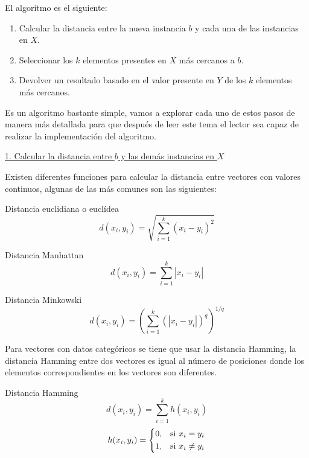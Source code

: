 \documentclass[11pt,fleqn]{book} %
\begin{document}
El algoritmo es el siguiente:
\begin{enumerate}
\item Calcular la distancia entre la nueva instancia $b$ y cada una de las instancias en $X$.
\item Seleccionar los $k$ elementos presentes en $X$ más cercanos a $b$.
\item Devolver un resultado basado en el valor presente en $Y$ de los $k$ elementos más cercanos.
\end{enumerate}

Es un algoritmo bastante simple, vamos a explorar cada uno de estos pasos de manera más detallada para que después de leer este tema el lector sea capaz de realizar la implementación del algoritmo.

\underline{1. Calcular la distancia entre $b$ y las demás instancias en $X$}

Existen diferentes funciones para calcular la distancia entre vectores con valores continuos, algunas de las más comunes son las siguientes:

Distancia euclidiana o euclídea
\begin{equation}
\label{eqn:distancia_euclidiana}
d(x_i,y_i) = \sqrt{\sum_{i=1}^{k}\left (  x_i - y_i \right )^{2}}
\end{equation}

Distancia Manhattan
\begin{equation}
\label{eqn:distancia_manhattan}
d(x_i,y_i) = \sum_{i=1}^{k}  \left | x_i - y_i  \right |
\end{equation}

Distancia Minkowski
\begin{equation}
\label{eqn:distancia_Minkowski}
d(x_i,y_i) = \left ( \sum_{i=1}^{k}  \left ( \left | x_i - y_i  \right | \right )^q \right )^{1/q}
\end{equation}

Para vectores con datos categóricos se tiene que usar la distancia Hamming, la distancia Hamming entre dos vectores es igual al número de posiciones donde los elementos correspondientes en los vectores son diferentes.

Distancia Hamming
\begin{equation}
\label{eqn:distancia_Hamming}
d(x_i,y_i) = \sum_{i=1}^{k} h(x_i,y_i)
\end{equation}
\begin{equation}
    h(x_i,y_i)= 
\begin{dcases}
    0,& \text{si } x_i = y_i\\
    1,& \text{si } x_i \neq  y_i
\end{dcases} 
\end{equation}
\end{document}
